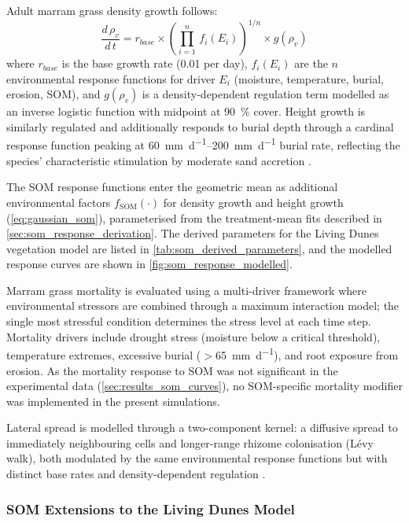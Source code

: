 \documentclass[authoryear,preprint,review,12pt]{elsarticle}
\newcommand{\SOM}{\mathrm{SOM}}
\begin{document}
Adult marram grass density growth follows:
\begin{equation}
\frac{d\,\rho_v}{d\,t} = r_{base} \times \left(\prod_{i=1}^{n}\, f_i(E_i)\right)^{1/n} \times g(\rho_v)
\label{eq:veg_growth}
\end{equation}
where $r_{base}$ is the base growth rate (\num{0.01} per day), $f_i(E_i)$ are the $n$ environmental response functions for driver $E_i$ (moisture, temperature, burial, erosion, SOM), and $g(\rho_v)$ is a density-dependent regulation term modelled as an inverse logistic function with midpoint at \SI{90}{\percent} cover. Height growth is similarly regulated and additionally responds to burial depth through a cardinal response function peaking at \SIrange{60}{200}{\milli\metre\per\day} burial rate, reflecting the species' characteristic stimulation by moderate sand accretion \citep{disraeli1984effect, huiskes1979ammophila}.

The SOM response functions enter the geometric mean as additional environmental factors $f_{\SOM}(\cdot)$ for density growth and height growth (\cref{eq:gaussian_som}), parameterised from the treatment-mean fits described in \cref{sec:som_response_derivation}. The derived parameters for the Living Dunes vegetation model are listed in \cref{tab:som_derived_parameters}, and the modelled response curves are shown in \cref{fig:som_response_modelled}.

Marram grass mortality is evaluated using a multi-driver framework where environmental stressors are combined through a maximum interaction model; the single most stressful condition determines the stress level at each time step. Mortality drivers include drought stress (moisture below a critical threshold), temperature extremes, excessive burial ($>$\SI{65}{\milli\metre\per\day}), and root exposure from erosion. As the mortality response to SOM was not significant in the experimental data (\cref{sec:results_som_curves}), no SOM-specific mortality modifier was implemented in the present simulations.

Lateral spread is modelled through a two-component kernel: a diffusive spread to immediately neighbouring cells and longer-range rhizome colonisation (L\'{e}vy walk), both modulated by the same environmental response functions but with distinct base rates and density-dependent regulation \citep{bonte2021biomorphogenic}.


\subsubsection{SOM Extensions to the Living Dunes Model}
\label{sec:som_extensions}
\end{document}
